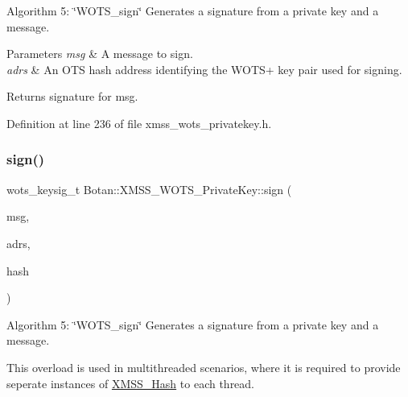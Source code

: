 Algorithm 5\+: \char`\"{}\+W\+O\+T\+S\+\_\+sign\char`\"{} Generates a signature from a private key and a message.


\begin{DoxyParams}{Parameters}
{\em msg} & A message to sign. \\
\hline
{\em adrs} & An O\+TS hash address identifying the W\+O\+T\+S+ key pair used for signing.\\
\hline
\end{DoxyParams}
\begin{DoxyReturn}{Returns}
signature for msg. 
\end{DoxyReturn}


Definition at line 236 of file xmss\+\_\+wots\+\_\+privatekey.\+h.

\mbox{\label{class_botan_1_1_x_m_s_s___w_o_t_s___private_key_a035d5d63b7042ebf1709e9c898956e96}} 
\subsubsection{\texorpdfstring{sign()}{sign()}\hspace{0.1cm}{\footnotesize\ttfamily [2/2]}}
{\footnotesize\ttfamily wots\+\_\+keysig\+\_\+t Botan\+::\+X\+M\+S\+S\+\_\+\+W\+O\+T\+S\+\_\+\+Private\+Key\+::sign (\begin{DoxyParamCaption}\item[{const secure\+\_\+vector$<$ uint8\+\_\+t $>$ \&}]{msg,  }\item[{\mbox{\hyperlink{class_botan_1_1_x_m_s_s___address}{X\+M\+S\+S\+\_\+\+Address}} \&}]{adrs,  }\item[{\mbox{\hyperlink{class_botan_1_1_x_m_s_s___hash}{X\+M\+S\+S\+\_\+\+Hash}} \&}]{hash }\end{DoxyParamCaption})}

Algorithm 5\+: \char`\"{}\+W\+O\+T\+S\+\_\+sign\char`\"{} Generates a signature from a private key and a message.

This overload is used in multithreaded scenarios, where it is required to provide seperate instances of \mbox{\hyperlink{class_botan_1_1_x_m_s_s___hash}{X\+M\+S\+S\+\_\+\+Hash}} to each thread.


